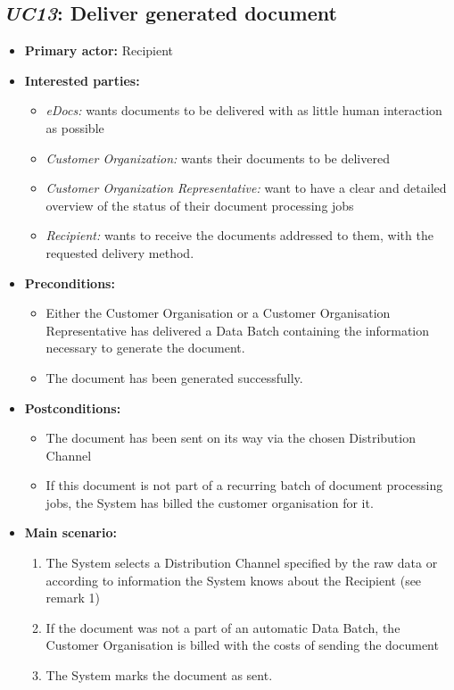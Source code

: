 \documentclass[a4paper,10pt]{article}
\begin{document}
\subsection{\emph{UC13}: Deliver generated document}
\begin{itemize}
    \item \textbf{Primary actor:} Recipient
    \item \textbf{Interested parties:} 
        \begin{itemize}
            \item \textit{eDocs:} wants documents to be delivered with as little human interaction as possible
            \item \textit{Customer Organization:} wants their documents to be delivered
            \item \textit{Customer Organization Representative:} want to have a clear and detailed overview of the status of their document processing jobs
            \item \textit{Recipient:} wants to receive the documents addressed to them, with the requested delivery method.
        \end{itemize}

    \item \textbf{Preconditions:}
        \begin{itemize}
            \item Either the Customer Organisation or a Customer Organisation Representative has delivered a Data Batch containing the information necessary to generate the document.
            \item The document has been generated successfully.
        \end{itemize}

    \item \textbf{Postconditions:}
        \begin{itemize}
            \item The document has been sent on its way via the chosen Distribution Channel
            \item If this document is not part of a recurring batch of document processing jobs, the System has billed the customer organisation for it.
        \end{itemize}
        
    \item \textbf{Main scenario:} 
    \begin{enumerate}
       \item The System selects a Distribution Channel specified by the raw data or according to information the System knows about the Recipient (see remark 1)
       \item If the document was not a part of an automatic Data Batch, the Customer Organisation is billed with the costs of sending the document
       \item The System marks the document as sent.
    \end{enumerate}


\end{itemize}
\end{document}
